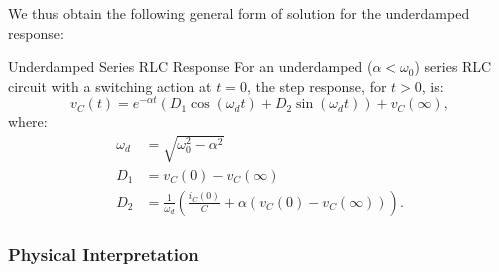 \documentclass[twoside]{article}
\begin{document}
We thus obtain the following general form of solution for the underdamped response:
\begin{cyanbox}{Underdamped Series RLC Response}
    For an underdamped ($\alpha < \omega_{0}$) series RLC circuit with a switching action at $t = 0$, the step response, for $t > 0$, is:
    \[
        v_{C}(t) = e^{-\alpha t}\left(D_{1}\cos(\omega_{d}t) + D_{2}\sin(\omega_{d}t)\right) + v_{C}(\infty),
    \]
    where:
    \begin{align*}
    \omega_{d} &= \sqrt{\omega_{0}^{2} - \alpha^{2}} \\
        D_{1} &= v_{C}(0) - v_{C}(\infty) \\
    D_{2} &= \frac{1}{\omega_{d}}\left(\frac{i_{C}(0)}{C} + \alpha\left(v_{C}(0) - v_{C}(\infty)\right)\right).
    \end{align*}
\end{cyanbox}

\subsubsection*{Physical Interpretation}
\end{document}
